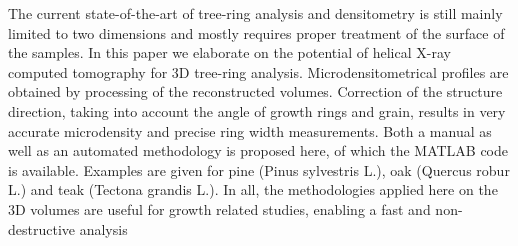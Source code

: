 {{\begin{enumerate}
The current state-of-the-art of tree-ring analysis and densitometry is still mainly limited to two dimensions and mostly requires proper treatment of the surface of the samples. In this paper we elaborate on the potential of helical X-ray computed tomography for 3D tree-ring analysis. Microdensitometrical profiles are obtained by processing of the reconstructed volumes. Correction of the structure direction, taking into account the angle of growth rings and grain, results in very accurate microdensity and precise ring width measurements. Both a manual as well as an automated methodology is proposed here, of which the MATLAB code is available. Examples are given for pine (Pinus sylvestris L.), oak (Quercus robur L.) and teak (Tectona grandis L.). In all, the methodologies applied here on the 3D volumes are useful for growth related studies, enabling a fast and non-destructive analysis
\clearpage
{}
\\ \aabstract

\end{enumerate}}}
